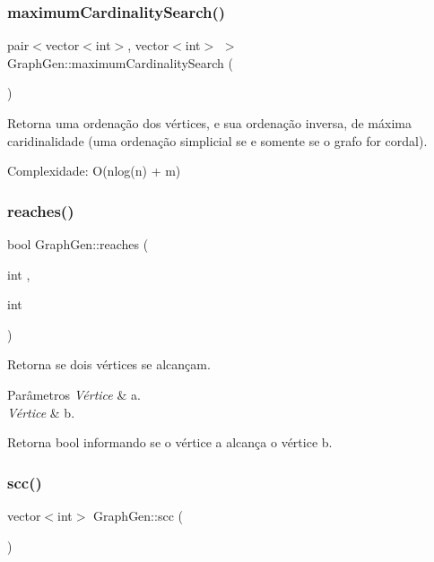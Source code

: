 \subsubsection{\texorpdfstring{maximum\+Cardinality\+Search()}{maximumCardinalitySearch()}}
{\footnotesize\ttfamily pair$<$vector$<$int$>$, vector$<$int$>$ $>$ Graph\+Gen\+::maximum\+Cardinality\+Search (\begin{DoxyParamCaption}{ }\end{DoxyParamCaption})\hspace{0.3cm}{\ttfamily [protected]}}

Retorna uma ordenação dos vértices, e sua ordenação inversa, de máxima caridinalidade (uma ordenação simplicial se e somente se o grafo for cordal).

Complexidade\+: O(nlog(n) + m) \mbox{\label{classGraphGen_a4fba74f3a12a3153843f550569981b0b}} 
\subsubsection{\texorpdfstring{reaches()}{reaches()}}
{\footnotesize\ttfamily bool Graph\+Gen\+::reaches (\begin{DoxyParamCaption}\item[{int}]{,  }\item[{int}]{ }\end{DoxyParamCaption})}

Retorna se dois vértices se alcançam. 
\begin{DoxyParams}{Parâmetros}
{\em Vértice} & a. \\
\hline
{\em Vértice} & b. \\
\hline
\end{DoxyParams}
\begin{DoxyReturn}{Retorna}
bool informando se o vértice \textquotesingle{}a\textquotesingle{} alcança o vértice \textquotesingle{}b\textquotesingle{}. 
\end{DoxyReturn}
\mbox{\label{classGraphGen_a875733956a1f667d68afb420f53ecc86}} 
\subsubsection{\texorpdfstring{scc()}{scc()}}
{\footnotesize\ttfamily vector$<$int$>$ Graph\+Gen\+::scc (\begin{DoxyParamCaption}{ }\end{DoxyParamCaption})}

